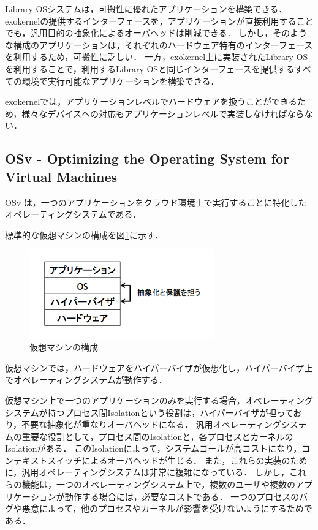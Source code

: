 \documentclass[graduation-thesis]{mlarticle}
\begin{document}
Library OSシステムは，可搬性に優れたアプリケーションを構築できる．
exokernelの提供するインターフェースを，アプリケーションが直接利用することでも，汎用目的の抽象化によるオーバヘッドは削減できる．
しかし，そのような構成のアプリケーションは，それぞれのハードウェア特有のインターフェースを利用するため，可搬性に乏しい．
一方，exokernel上に実装されたLibrary OSを利用することで，利用するLibrary OSと同じインターフェースを提供するすべての環境で実行可能なアプリケーションを構築できる．

exokernelでは，アプリケーションレベルでハードウェアを扱うことができるため，様々なデバイスへの対応もアプリケーションレベルで実装しなければならない．

\subsection {OSv - Optimizing the Operating System for Virtual Machines}
\label{relative:unikernel}
OSv は，一つのアプリケーションをクラウド環境上で実行することに特化したオペレーティングシステムである．

標準的な仮想マシンの構成を図\ref{fig:vm}に示す．

\begin{figure}[H]
  \begin{center}
    \includegraphics[width=8.0cm]{images/vm.png}
    \caption{仮想マシンの構成}
    \label{fig:vm}
  \end{center}
\end{figure}

仮想マシンでは，ハードウェアをハイパーバイザが仮想化し，ハイパーバイザ上でオペレーティングシステムが動作する．

仮想マシン上で一つのアプリケーションのみを実行する場合，オペレーティングシステムが持つプロセス間Isolationという役割は，ハイパーバイザが担っており，不要な抽象化が重なりオーバヘッドになる．
汎用オペレーティングシステムの重要な役割として，プロセス間のIsolationと，各プロセスとカーネルのIsolationがある．
このIsolationによって，システムコールが高コストになり，コンテキストスイッチによるオーバヘッドが生じる．
また，これらの実装のために，汎用オペレーティングシステムは非常に複雑になっている．
しかし，これらの機能は，一つのオペレーティングシステム上で，複数のユーザや複数のアプリケーションが動作する場合には，必要なコストである．
一つのプロセスのバグや悪意によって，他のプロセスやカーネルが影響を受けないようにするためである．
\end{document}
